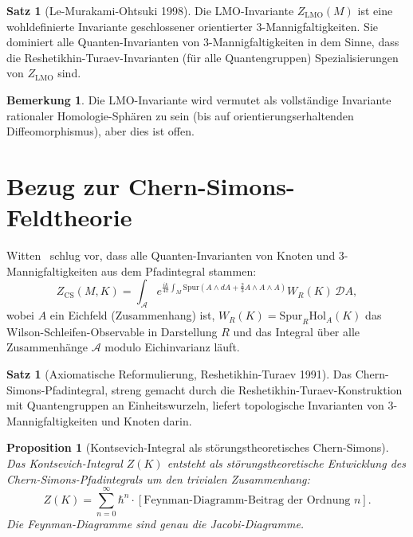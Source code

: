 \documentclass[12pt,a4paper]{amsart}
\newtheorem{proposition}[theorem]{Proposition}
\theoremstyle{definition}
\newtheorem{satz}[theorem]{Satz}
\newtheorem{bemerkung}[theorem]{Bemerkung}
\begin{document}
\begin{satz}[Le-Murakami-Ohtsuki 1998]\label{satz:LMO}
Die LMO-Invariante $Z_{\mathrm{LMO}}(M)$ ist eine wohldefinierte Invariante
geschlossener orientierter $3$-Mannigfaltigkeiten.  Sie dominiert alle
Quanten-Invarianten von $3$-Mannigfaltigkeiten in dem Sinne, dass die
Reshetikhin-Turaev-Invarianten (für alle Quantengruppen) Spezialisierungen
von $Z_{\mathrm{LMO}}$ sind.
\end{satz}

\begin{bemerkung}
Die LMO-Invariante wird vermutet als vollständige Invariante rationaler
Homologie-Sphären zu sein (bis auf orientierungserhaltenden Diffeomorphismus),
aber dies ist offen.
\end{bemerkung}

\section{Bezug zur Chern-Simons-Feldtheorie}\label{sec:chern}

Witten~\cite{witten1989} schlug vor, dass alle Quanten-Invarianten von
Knoten und $3$-Mannigfaltigkeiten aus dem Pfadintegral stammen:
\[
  Z_{\mathrm{CS}}(M, K) = \int_{\mathcal{A}} e^{\frac{ik}{4\pi} \int_M \mathrm{Spur}(A \wedge dA + \tfrac{2}{3} A \wedge A \wedge A)} W_R(K) \,\mathcal{D}A,
\]
wobei $A$ ein Eichfeld (Zusammenhang) ist, $W_R(K) = \mathrm{Spur}_R \mathrm{Hol}_A(K)$
das Wilson-Schleifen-Observable in Darstellung $R$ und das Integral über
alle Zusammenhänge $\mathcal{A}$ modulo Eichinvarianz läuft.

\begin{satz}[Axiomatische Reformulierung, Reshetikhin-Turaev 1991]
Das Chern-Simons-Pfadintegral, streng gemacht durch die
Reshetikhin-Turaev-Konstruktion~\cite{reshetikhin1991} mit Quantengruppen
an Einheitswurzeln, liefert topologische Invarianten von $3$-Mannigfaltigkeiten
und Knoten darin.
\end{satz}

\begin{proposition}[Kontsevich-Integral als störungstheoretisches Chern-Simons]
Das Kontsevich-Integral $Z(K)$ entsteht als störungstheoretische Entwicklung
des Chern-Simons-Pfadintegrals um den trivialen Zusammenhang:
\[
  Z(K) = \sum_{n=0}^\infty \hbar^n \cdot [\text{Feynman-Diagramm-Beitrag der Ordnung } n].
\]
Die Feynman-Diagramme sind genau die Jacobi-Diagramme.
\end{proposition}
\end{document}
